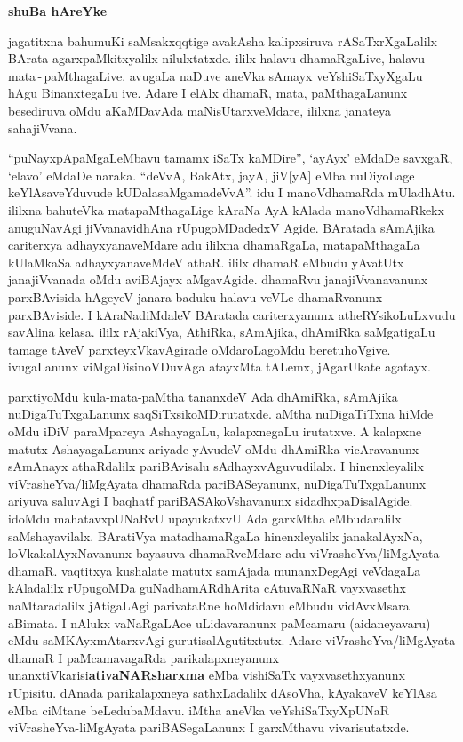\begin{center}
{\Huge\bfseries shuBa hAreYke}
\end{center}

\thispagestyle{empty}

\bigskip

jagatitxna bahumuKi saMsakxqqtige avakAsha kalipxsiruva rASaTxrXgaLalilx BArata agarxpaMkitxyalilx nilulxtatxde. ililx halavu dhamaRgaLive, halavu mata\,-\,paMthagaLive. avugaLa naDuve aneVka sAmayx veYshiSaTxyXgaLu hAgu BinanxtegaLu ive. Adare I elAlx dhamaR, mata, paMthagaLanunx besediruva oMdu aKaMDavAda maNisUtarxveMdare, ililxna janateya sahajiVvana. 

\medskip

``puNayxpApaMgaLeMbavu tamamx iSaTx kaMDire'', `ayAyx' eMdaDe savxgaR, `elavo'  eMdaDe naraka. ``deVvA, BakAtx, jayA, jiV[yA] eMba nuDiyoLage keYlAsaveYduvude kUDalasaMgamadeVvA''. idu I manoV\-dhamaRda mUladhAtu. ililxna bahuteVka mata\-paMthagaLige kAraNa AyA kAlada manoVdhamaRkekx anuguNavAgi jiVvana\-vidhAna rUpugoMDadedxV Agide. BAratada sAmAjika cariterxya adhayxyanaveMdare adu ililxna dhamaRgaLa, matapaMthagaLa kUlaMkaSa \hbox{adhayxyanaveMdeV} athaR. ililx dhamaR eMbudu yAvatUtx janajiVvanada oMdu aviBAjayx aMgavAgide. dhamaRvu janajiVvanavanunx parxBAvisida hAgeyeV janara baduku halavu veVLe dhamaRvanunx parxBAviside. I kAraNadiMdaleV BAratada cariterxyanunx atheRYsikoLuLxvudu savAlina kelasa. ililx \hbox{rAjakiVya}, AthiRka, sAmAjika, dhAmiRka saMgatigaLu tamage tAveV parxteyxVkavAgirade oMdaroLagoMdu beretuhoVgive. ivu\-gaLanunx viMgaDisi\break noVDuvAga atayxMta tALemx, jAgarUkate agatayx.

\medskip

parxtiyoMdu kula-mata-paMtha tananxdeV Ada dhAmiRka, sAmAjika nuDigaTuTxgaLanunx saqSiTxsikoMDirutatxde. aMtha nuDigaTiTxna hiMde oMdu iDiV paraMpareya AshayagaLu, kalapxnegaLu irutatxve. A kalapxne matutx AshayagaLanunx ariyade yAvudeV oMdu dhAmiRka vicAravanunx sAmAnayx athaRdalilx pariBAvisalu sAdhayxvAguvudilalx. I hinenxleyalilx viVrasheYva/liMgAyata dhamaRda pariBASe\-yanunx, nuDigaTuTxgaLanunx ariyuva saluvAgi I baqhatf pariBASAkoVshavanunx sidadhxpaDisalAgide. idoMdu mahatavx\-pUNaRvU upayukatxvU Ada garxMtha eMbudaralilx saMshayavilalx. BAratiVya matadhamaRgaLa hinenxleyalilx janakalAyxNa, loVkakalAyxNa\-vanunx bayasuva dhamaRveMdare adu viVrasheYva/liMgAyata dhamaR. vaqtitxya kushalate matutx samAjada munanxDegAgi veVdagaLa kAladalilx rUpugoMDa guNadhamARdhArita cAtuvaRNaR vayxvasethx naMtaradalilx jAtigaLAgi parivataRne hoMdi\-davu eMbudu \hbox{vidAvxMsara} aBimata. I nAlukx vaNaRgaLAce uLidavaranunx paMcamaru (aidaneyavaru) eMdu saMKAyxmAtarxvAgi gurutisalAgutitxtutx. Adare viVrasheYva/liMgAyata dhamaR I paMcamavagaRda parikalapxneyanunx unanxtiVkarisi\break \textbf{ativaNARsharxma} eMba vishiSaTx vayxvasethxyanunx rUpisitu. dAnada parikalapxneya sathxLadalilx dAsoVha, kAyakaveV keYlAsa eMba ciMtane beLedubaMdavu. iMtha aneVka veYshiSaTxyXpUNaR viVrasheYva-liMgAyata pariBASegaLanunx I garxMthavu vivarisutatxde.

